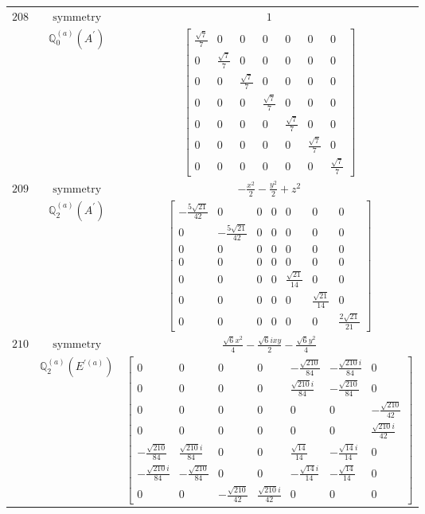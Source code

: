 \documentclass[fleqn,8pt,landscape]{jsarticle}
\begin{document}
\begin{longtable}{ccc}
$ 208 $ & $ \text{symmetry} $ & $ 1 $ \\
$  $ & $ \mathbb{Q}_{0}^{(a)}(A^{\prime}) $ & $ \begin{bmatrix} \frac{\sqrt{7}}{7} & 0 & 0 & 0 & 0 & 0 & 0 \\ 0 & \frac{\sqrt{7}}{7} & 0 & 0 & 0 & 0 & 0 \\ 0 & 0 & \frac{\sqrt{7}}{7} & 0 & 0 & 0 & 0 \\ 0 & 0 & 0 & \frac{\sqrt{7}}{7} & 0 & 0 & 0 \\ 0 & 0 & 0 & 0 & \frac{\sqrt{7}}{7} & 0 & 0 \\ 0 & 0 & 0 & 0 & 0 & \frac{\sqrt{7}}{7} & 0 \\ 0 & 0 & 0 & 0 & 0 & 0 & \frac{\sqrt{7}}{7} \end{bmatrix} $ \\ \hline
$ 209 $ & $ \text{symmetry} $ & $ - \frac{x^{2}}{2} - \frac{y^{2}}{2} + z^{2} $ \\
$  $ & $ \mathbb{Q}_{2}^{(a)}(A^{\prime}) $ & $ \begin{bmatrix} - \frac{5 \sqrt{21}}{42} & 0 & 0 & 0 & 0 & 0 & 0 \\ 0 & - \frac{5 \sqrt{21}}{42} & 0 & 0 & 0 & 0 & 0 \\ 0 & 0 & 0 & 0 & 0 & 0 & 0 \\ 0 & 0 & 0 & 0 & 0 & 0 & 0 \\ 0 & 0 & 0 & 0 & \frac{\sqrt{21}}{14} & 0 & 0 \\ 0 & 0 & 0 & 0 & 0 & \frac{\sqrt{21}}{14} & 0 \\ 0 & 0 & 0 & 0 & 0 & 0 & \frac{2 \sqrt{21}}{21} \end{bmatrix} $ \\ \hline
$ 210 $ & $ \text{symmetry} $ & $ \frac{\sqrt{6} x^{2}}{4} - \frac{\sqrt{6} i x y}{2} - \frac{\sqrt{6} y^{2}}{4} $ \\
$  $ & $ \mathbb{Q}_{2}^{(a)}(E^{\prime(a)}) $ & $ \begin{bmatrix} 0 & 0 & 0 & 0 & - \frac{\sqrt{210}}{84} & - \frac{\sqrt{210} i}{84} & 0 \\ 0 & 0 & 0 & 0 & \frac{\sqrt{210} i}{84} & - \frac{\sqrt{210}}{84} & 0 \\ 0 & 0 & 0 & 0 & 0 & 0 & - \frac{\sqrt{210}}{42} \\ 0 & 0 & 0 & 0 & 0 & 0 & \frac{\sqrt{210} i}{42} \\ - \frac{\sqrt{210}}{84} & \frac{\sqrt{210} i}{84} & 0 & 0 & \frac{\sqrt{14}}{14} & - \frac{\sqrt{14} i}{14} & 0 \\ - \frac{\sqrt{210} i}{84} & - \frac{\sqrt{210}}{84} & 0 & 0 & - \frac{\sqrt{14} i}{14} & - \frac{\sqrt{14}}{14} & 0 \\ 0 & 0 & - \frac{\sqrt{210}}{42} & \frac{\sqrt{210} i}{42} & 0 & 0 & 0 \end{bmatrix} $ \\ \hline

\end{longtable}
\end{document}
